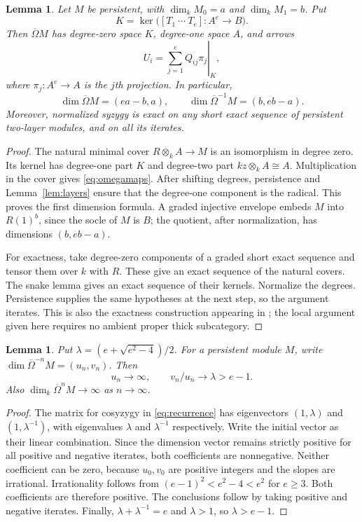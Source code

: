 \documentclass[11pt]{article}
\newtheorem{lemma}[theorem]{Lemma}
\theoremstyle{definition}\newtheorem{definition}[theorem]{Definition}
\theoremstyle{remark}\newtheorem{remark}[theorem]{Remark}
\newcommand{\Om}{\overline\Omega}
\begin{document}
\begin{lemma}\label{lem:omega}
Let $M$ be persistent, with $\dim_kM_0=a$ and $\dim_kM_1=b$. Put
\[
 K=\ker\bigl([T_1\ \cdots\ T_e]:A^e\longrightarrow B\bigr).
\]
Then $\Om M$ has degree-zero space $K$, degree-one space $A$, and arrows
\begin{equation}\label{eq:omegamaps}
 U_i=\left.\sum_{j=1}^eQ_{ij}\pi_j\right|_K,
\end{equation}
where $\pi_j:A^e\to A$ is the $j$th projection. In particular,
\begin{equation}\label{eq:recurrence}
 \dim\Om M=(ea-b,a),\qquad
 \dim\Om^{-1}M=(b,eb-a).
\end{equation}
Moreover, normalized syzygy is exact on any short exact sequence of persistent two-layer modules, and on all its iterates.
\end{lemma}
\begin{proof}
The natural minimal cover $R\otimes_k A\to M$ is an isomorphism in degree zero. Its kernel has degree-one part $K$ and degree-two part $kz\otimes_kA\cong A$. Multiplication in the cover gives \eqref{eq:omegamaps}. After shifting degrees, persistence and Lemma~\ref{lem:layers} ensure that the degree-one component is the radical. This proves the first dimension formula. A graded injective envelope embeds $M$ into $R(1)^b$, since the socle of $M$ is $B$; the quotient, after normalization, has dimensions $(b,eb-a)$.

For exactness, take degree-zero components of a graded short exact sequence and tensor them over $k$ with $R$. These give an exact sequence of the natural covers. The snake lemma gives an exact sequence of their kernels. Normalize the degrees. Persistence supplies the same hypotheses at the next step, so the argument iterates. This is also the exactness construction appearing in \cite[Lemma 3.11]{K}; the local argument given here requires no ambient proper thick subcategory.
\end{proof}

\begin{lemma}\label{lem:growth}
Put $\lambda=(e+\sqrt{e^2-4})/2$. For a persistent module $M$, write $\dim\Om^{-n}M=(u_n,v_n)$. Then
\[
 u_n\longrightarrow\infty,\qquad v_n/u_n\longrightarrow\lambda>e-1.
\]
Also $\dim_k\Om^nM\to\infty$ as $n\to\infty$.
\end{lemma}
\begin{proof}
The matrix for cosyzygy in \eqref{eq:recurrence} has eigenvectors $(1,\lambda)$ and $(1,\lambda^{-1})$, with eigenvalues $\lambda$ and $\lambda^{-1}$ respectively. Write the initial vector as their linear combination. Since the dimension vector remains strictly positive for all positive and negative iterates, both coefficients are nonnegative. Neither coefficient can be zero, because $u_0,v_0$ are positive integers and the slopes are irrational. Irrationality follows from $(e-1)^2<e^2-4<e^2$ for $e\ge3$. Both coefficients are therefore positive. The conclusions follow by taking positive and negative iterates. Finally, $\lambda+\lambda^{-1}=e$ and $\lambda>1$, so $\lambda>e-1$.
\end{proof}
\end{document}
